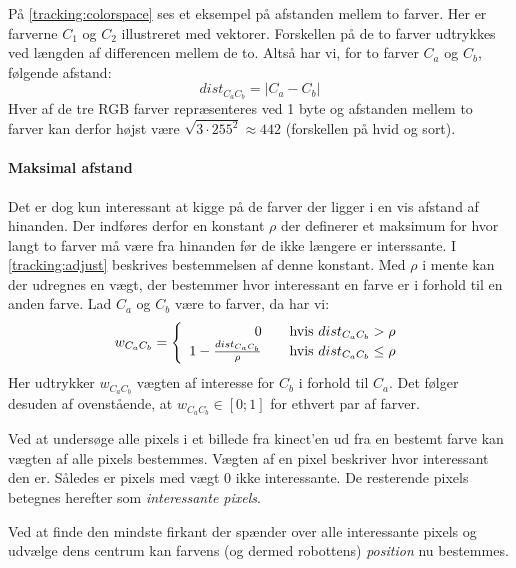 På \cref{tracking:colorspace} ses et eksempel på afstanden mellem to farver.
Her er farverne $C_1$ og $C_2$ illustreret med vektorer.
Forskellen på de to farver udtrykkes ved længden af differencen mellem de to.
Altså har vi, for to farver $C_a$ og $C_b$, følgende afstand:
\begin{equation}
dist_{C_aC_b} = |C_a - C_b|
\end{equation}
Hver af de tre RGB farver repræsenteres ved 1 byte og afstanden mellem to farver kan derfor højst være $\sqrt{3 \cdot 255^2} \approx 442$ (forskellen på hvid og sort).

\paragraph{Maksimal afstand}
Det er dog kun interessant at kigge på de farver der ligger i en vis afstand af hinanden.
Der indføres derfor en konstant $\rho$ der definerer et maksimum for hvor langt to farver må være fra hinanden før de ikke længere er interssante.
I \cref{tracking:adjust} beskrives bestemmelsen af denne konstant.
Med $\rho$ i mente kan der udregnes en vægt, der bestemmer hvor interessant en farve er i forhold til en anden farve.
Lad $C_a$ og $C_b$ være to farver, da har vi:
\begin{equation}
w_{C_aC_b} = \left\{ 
  \begin{array}{r l}
        0 & \quad \text{hvis $dist_{C_aC_b} > \rho$} \\
       1 - \frac{dist_{C_aC_b}}{\rho} & \quad \text{hvis $dist_{C_aC_b} \leq \rho$}
  \end{array} \right.
\end{equation}
Her udtrykker $w_{C_aC_b}$ vægten af interesse for $C_b$ i forhold til $C_a$.
Det følger desuden af ovenstående, at $w_{C_aC_b} \in [0;1]$ for ethvert par af farver.

Ved at undersøge alle pixels i et billede fra kinect'en ud fra en bestemt farve kan vægten af alle pixels bestemmes.
Vægten af en pixel beskriver hvor interessant den er.
Således er pixels med vægt 0 ikke interessante.
De resterende pixels betegnes herefter som \emph{interessante pixels}.


Ved at finde den mindste firkant der spænder over alle interessante pixels og udvælge dens centrum kan farvens (og dermed robottens) \textit{position} nu bestemmes.


